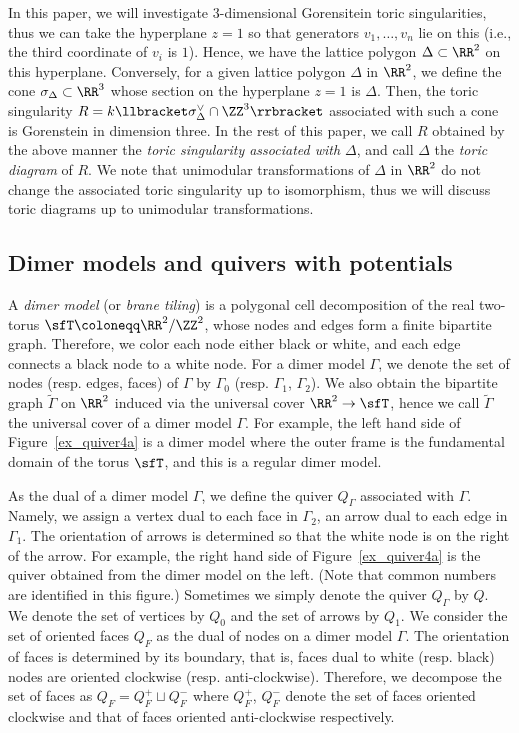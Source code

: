 In this paper, we will investigate $3$-dimensional Gorensitein toric singularities, thus we can take the hyperplane $z=1$ so that generators $v_1,\dots,v_n$ lie on this (i.e., the third coordinate of $v_i$ is $1$). Hence, we have the lattice polygon $\Delta\subset\RR^2$ on this hyperplane. Conversely, for a given lattice polygon $\Delta$ in $\RR^2$, we define the cone $\sigma_\Delta\subset\RR^3$ whose section on the hyperplane $z=1$ is $\Delta$. Then, the toric singularity $R=k\llbracket \sigma_\Delta^\vee\cap\ZZ^3\rrbracket $ associated with such a cone is Gorenstein in dimension three. In the rest of this paper, we call $R$ obtained by the above manner the \emph{toric singularity associated with $\Delta$}, and call $\Delta$ the \emph{toric diagram} of $R$. We note that unimodular transformations of $\Delta$ in $\RR^2$ do not change the associated toric singularity up to isomorphism, thus we will discuss toric diagrams up to unimodular transformations.



\subsection{Dimer models and quivers with potentials}\label{subsec_dimer}

A \emph{dimer model} (or \emph{brane tiling}) is a polygonal cell decomposition of the real two-torus $\sfT\coloneqq\RR^2/\ZZ^2$, whose nodes and edges form a finite bipartite graph. Therefore, we color each node either black or white, and each edge connects a black node to a white node. For a dimer model $\Gamma$, we denote the set of nodes (resp. edges, faces) of $\Gamma$ by $\Gamma_0$ (resp. $\Gamma_1$, $\Gamma_2$). We also obtain the bipartite graph $\widetilde{\Gamma}$ on $\RR^2$ induced via the universal cover $\RR^2\rightarrow\sfT$, hence we call $\widetilde{\Gamma}$ the universal cover of a dimer model $\Gamma$. For example, the left hand side of Figure~\ref{ex_quiver4a} is a dimer model where the outer frame is the fundamental domain of the torus $\sfT$, and this is a regular dimer model.

As the dual of a dimer model $\Gamma$, we define the quiver $Q_\Gamma$ associated with $\Gamma$. Namely, we assign a vertex dual to each face in $\Gamma_2$, an arrow dual to each edge in $\Gamma_1$. The orientation of arrows is determined so that the white node is on the right of the arrow. For example, the right hand side of Figure~\ref{ex_quiver4a} is the quiver obtained from the dimer model on the left. (Note that common numbers are identified in this figure.) Sometimes we simply denote the quiver $Q_\Gamma$ by $Q$. We denote the set of vertices by $Q_0$ and the set of arrows by $Q_1$. We consider the set of oriented faces $Q_F$ as the dual of nodes on a dimer model $\Gamma$. The orientation of faces is determined by its boundary, that is, faces dual to white (resp. black) nodes are oriented clockwise (resp. anti-clockwise). Therefore, we decompose the set of faces as $Q_F=Q^+_F\sqcup Q^-_F$ where $Q^+_F$, $Q^-_F$ denote the set of faces oriented clockwise and that of faces oriented anti-clockwise respectively.



